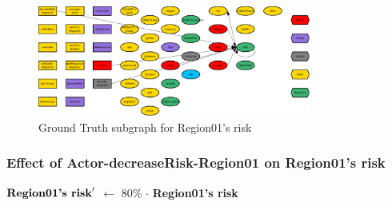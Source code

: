 \documentclass{article}%
\begin{document}
\begin{figure}[ht]%
\centering%
\includegraphics[width=0.8\textwidth]{images/riskOfRegion01.png}%
\caption{Ground Truth subgraph for Region01's risk}%
\end{figure}

%
\subsubsection{Effect of Actor{-}decreaseRisk{-}Region01 on Region01's risk}%
\label{ssubsec:Effect of Actor{-}decreaseRisk{-}Region01 on Region01's risk}%
\begin{flushleft}%
$\mbox{\textbf{Region01's risk}} '$%
$\leftarrow$%
80\%%
$\cdot$%
\textbf{Region01's risk}%
\end{flushleft}

%
\end{document}

